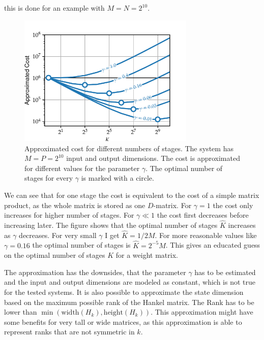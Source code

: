 \documentclass[doctype=mastersthesis,BCOR=15mm,biblatex]{ldvbook}%
\begin{document}
this is done for an example with $M=N = 2^{10}$.
\begin{figure}[htb]
	\centering
	\includegraphics[width=0.75\textwidth]{Plots/cost_parameters.pdf}
	\caption{Approximated cost for different numbers of stages. The system has $M=P=2^{10}$ input and output dimensions. 
	The cost is approximated for different values for the parameter $\gamma$.
	The optimal number of stages for every $\gamma$ is marked with a circle.}
	\label{fig:cost_parameters}
\end{figure}

We can see that for one stage the cost is equivalent to the cost of a simple matrix product, as the whole matrix is stored as one $D$-matrix.
For $\gamma = 1$ the cost only increases for higher number of stages. 
For $\gamma \ll 1$ the cost first decreases before increasing later.
The figure shows that the optimal number of stages $\hat{K}$ increases as $\gamma$ decreases.
For very small $\gamma$ I get $\hat{K} = 1/2 M$.
For more reasonable values like $\gamma=0.16$ the optimal number of stages is $\hat{K}=2^{-5}M$. 
This gives an educated guess on the optimal number of stages $K$ for a weight matrix.

The approximation has the downsides, that the parameter $\gamma$ has to be estimated
and the input and output dimensions are modeled as constant, which is not true for the tested systems.
It is also possible to approximate the state dimension based on the maximum possible rank of the Hankel matrix.
The Rank has to be lower than $\min(\text{width}(H_k),\text{height}(H_k))$.
This approximation might have some benefits for very tall or wide matrices, as this approximation is able to represent ranks that are not symmetric in $k$. 
\end{document}
